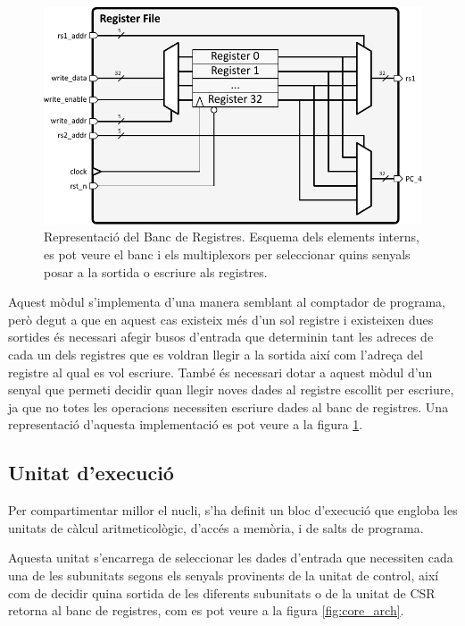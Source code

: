 \documentclass[10pt,a4paper,twocolumn,twoside]{article}
\begin{document}
    \begin{figure}[!ht]
    \centering
    	\includegraphics[width=0.9\linewidth]{pdf/regfile.pdf}
        \caption{Representació del Banc de Registres. Esquema dels elements interns, es pot veure el banc i els multiplexors per seleccionar quins senyals posar a la sortida o escriure als registres.}
        \label{fig:regfile}
    \end{figure}
    
    Aquest mòdul s'implementa d'una manera semblant al comptador de programa, però degut a que en aquest cas existeix més d'un sol registre i existeixen dues sortides és necessari afegir busos d'entrada que determinin tant les adreces de cada un dels registres que es voldran llegir a la sortida així com l'adreça del registre al qual es vol escriure. També és necessari dotar a aquest mòdul d'un senyal que permeti decidir quan llegir noves dades al registre escollit per escriure, ja que no totes les operacions necessiten escriure dades al banc de registres. Una representació d'aquesta implementació es pot veure a la figura \ref{fig:regfile}.
    
    
    
    
    \subsection{Unitat d'execució}
    Per compartimentar millor el nucli, s'ha definit un bloc d'execució que engloba les unitats de càlcul aritmeticològic, d'accés a memòria, i de salts de programa.
    
    Aquesta unitat s'encarrega de seleccionar les dades d'entrada que necessiten cada una de les subunitats segons els senyals provinents de la unitat de control, així com de decidir quina sortida de les diferents subunitats o de la unitat de CSR retorna al banc de registres, com es pot veure a la figura \ref{fig:core_arch}.
    
\end{document}
